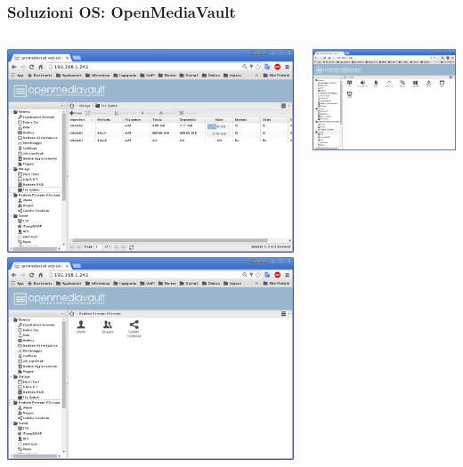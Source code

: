 \documentclass[11pt,xcolor=table]{beamer}
\begin{document}
\begin{frame}
	\frametitle{Soluzioni OS: OpenMediaVault}
	\begin{columns}
		\begin{column}{0.48\textwidth}
			\includegraphics[width=\textwidth]{OMV/OMV6.png}
			\vspace{1mm}
			\includegraphics[width=\textwidth]{OMV/OMV7.png}
		\end{column}
		\begin{column}{0.48\textwidth}
			\includegraphics[width=\textwidth]{OMV/OMV8.png}

\end{column}
\end{columns}
\end{frame}
\end{document}
